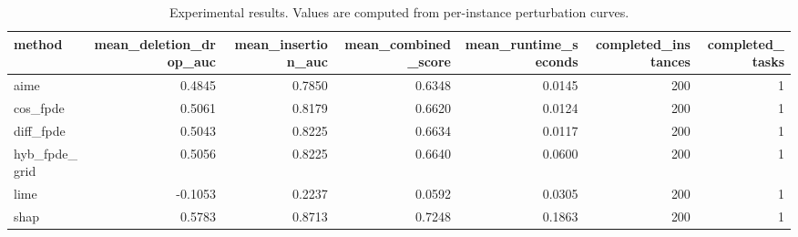 \begin{table}[t]
\caption{Experimental results. Values are computed from per-instance perturbation curves.}
\label{tab:main_results_computed}
\centering
\begin{tabular}{lrrrrrr}
\toprule
method & mean\_deletion\_drop\_auc & mean\_insertion\_auc & mean\_combined\_score & mean\_runtime\_seconds & completed\_instances & completed\_tasks \\
\midrule
aime & 0.4845 & 0.7850 & 0.6348 & 0.0145 & 200 & 1 \\
cos\_fpde & 0.5061 & 0.8179 & 0.6620 & 0.0124 & 200 & 1 \\
diff\_fpde & 0.5043 & 0.8225 & 0.6634 & 0.0117 & 200 & 1 \\
hyb\_fpde\_grid & 0.5056 & 0.8225 & 0.6640 & 0.0600 & 200 & 1 \\
lime & -0.1053 & 0.2237 & 0.0592 & 0.0305 & 200 & 1 \\
shap & 0.5783 & 0.8713 & 0.7248 & 0.1863 & 200 & 1 \\
\bottomrule
\end{tabular}

\end{table}
